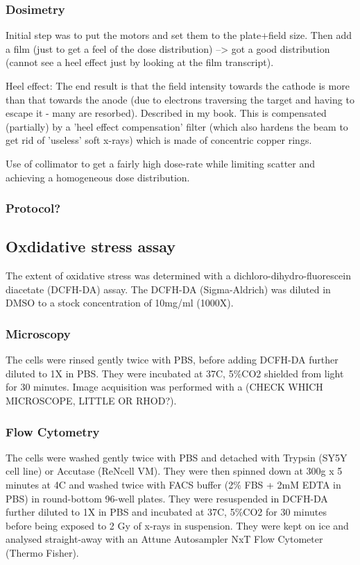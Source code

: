 \documentclass[onecolumn,10pt]{asme2ej}
\begin{document}
\subsubsection{Dosimetry}
Initial step was to put the motors and set them to the plate+field size. Then add a film (just to get a feel of the dose distribution) --> got a good distribution (cannot see a heel effect just by looking at the film transcript).

Heel effect: The end result is that the field intensity towards the cathode is more than that towards the anode (due to electrons traversing the target and having to escape it - many are resorbed). Described in my book. 
This is compensated (partially) by a 'heel effect compensation' filter (which also hardens the beam to get rid of 'useless' soft x-rays) which is made of concentric copper rings. 
 

Use of collimator to get a fairly high dose-rate while limiting scatter and achieving a homogeneous dose distribution.

\subsubsection{Protocol?}  




\subsection{Oxdidative stress assay}
The extent of oxidative stress was determined with a dichloro-dihydro-fluorescein diacetate (DCFH-DA) assay. The DCFH-DA (Sigma-Aldrich) was diluted in DMSO to a stock concentration of 10mg/ml (1000X).

\subsubsection{Microscopy}
The cells were rinsed gently twice with PBS, before adding DCFH-DA further diluted to 1X in PBS. They were incubated at 37C, 5\%CO2 shielded from light for 30 minutes. Image acquisition was performed with a (CHECK WHICH MICROSCOPE, LITTLE OR RHOD?). 

\subsubsection{Flow Cytometry}
The cells were washed gently twice with PBS and detached with Trypsin (SY5Y cell line) or Accutase (ReNcell VM). They were then spinned down at 300g x 5 minutes at 4C and washed twice with FACS buffer (2\% FBS + 2mM EDTA in PBS) in round-bottom 96-well plates. They were resuspended in DCFH-DA further diluted to 1X in PBS and incubated at 37C, 5\%CO2 for 30 minutes before being exposed to 2 Gy of x-rays in suspension. They were kept on ice and analysed straight-away with an Attune Autosampler NxT Flow Cytometer (Thermo Fisher). 
\end{document}
